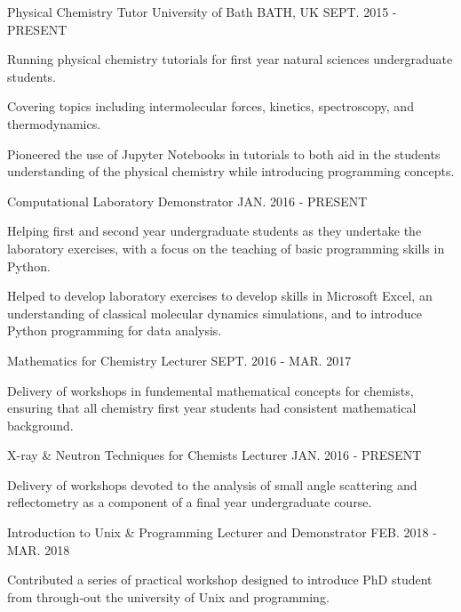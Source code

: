 \begin{cventries}
	\cventry
	{Physical Chemistry Tutor}
	{University of Bath}
	{BATH, UK}
	{SEPT. 2015 - PRESENT}
	{
		\begin{cvitems}
			\item {Running physical chemistry tutorials for first year natural sciences undergraduate students.}
			\item {Covering topics including intermolecular forces, kinetics, spectroscopy, and thermodynamics.}
			\item {Pioneered the use of Jupyter Notebooks in tutorials to both aid in the students understanding of the physical chemistry while introducing programming concepts.}
		\end{cvitems}
	}
	\cventry
	{Computational Laboratory Demonstrator}
	{}
	{}
	{JAN. 2016 - PRESENT}
	{
		\begin{cvitems}
			\item {Helping first and second year undergraduate students as they undertake the laboratory exercises, with a focus on the teaching of basic programming skills in Python.}
			\item {Helped to develop laboratory exercises to develop skills in Microsoft Excel, an understanding of classical molecular dynamics simulations, and to introduce Python programming for data analysis.}
		\end{cvitems}
	}
	\cventry
	{Mathematics for Chemistry Lecturer}
	{}
	{}
	{SEPT. 2016 - MAR. 2017}
	{
		\begin{cvitems}
			\item {Delivery of workshops in fundemental mathematical concepts for chemists, ensuring that all chemistry first year students had consistent mathematical background.}
		\end{cvitems}
	}
	\cventry
	{X-ray \& Neutron Techniques for Chemists Lecturer}
	{}
	{}
	{JAN. 2016 - PRESENT}
	{
		\begin{cvitems}
			\item {Delivery of workshops devoted to the analysis of small angle scattering and reflectometry as a component of a final year undergraduate course.}
		\end{cvitems}
	}
	\cventry
	{Introduction to Unix \& Programming Lecturer and Demonstrator}
	{}
	{}
	{FEB. 2018 - MAR. 2018}
	{
		\begin{cvitems}
			\item {Contributed a series of practical workshop designed to introduce PhD student from through-out the university of Unix and programming.}

\end{cvitems}}
\end{cventries}
